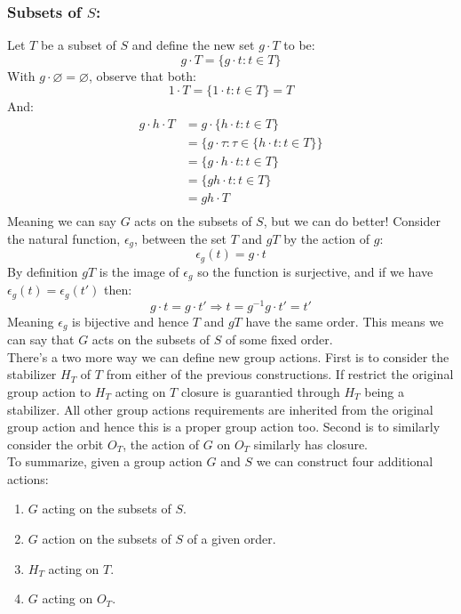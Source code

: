 \subsubsection{Subsets of $S$:}
Let $T$ be a subset of $S$ and define the new set $g\cdot T$ to be:
\[g\cdot T = \{g\cdot t: t\in T\}\]
With $g\cdot\varnothing=\varnothing$, 
observe that both:
\[1\cdot T = \{1\cdot t: t\in T\} = T\]
And:
\[\begin{aligned}
g\cdot h \cdot T &= g\cdot \{h\cdot t:t\in T\}\\
&= \{g\cdot \tau:\tau\in \{h\cdot t:t\in T\}\}\\
&= \{g\cdot h\cdot t:t\in T\}\\
&= \{gh\cdot t:t\in T\}\\
&= gh\cdot T\\
\end{aligned}\]
Meaning we can say $G$ acts on the subsets of $S$,
but we can do better!
Consider the natural function, $\epsilon_g$, between the set $T$ and $gT$ by the action of $g$:
\[\epsilon_g(t) = g\cdot t\]
By definition $gT$ is the image of $\epsilon_g$ so the function is surjective,
and if we have $\epsilon_g(t)=\epsilon_g(t')$ then:
\[g\cdot t = g\cdot t' \Rightarrow t=g^{-1}g\cdot t' = t'\]
Meaning $\epsilon_g$ is bijective and hence $T$ and $gT$ have the same order.
This means we can say that $G$ acts on the subsets of $S$ of some fixed order.
\\

There's a two more way we can define new group actions.
First is to consider the stabilizer $H_T$ of $T$ from either of the previous constructions.
If restrict the original group action to $H_T$ acting on $T$ closure is guarantied through $H_T$ being a stabilizer.
All other group actions requirements are inherited from the original group action and hence this is a proper group action too.
Second is to similarly consider the orbit $O_T$,
the action of $G$ on $O_T$ similarly has closure.
\\

To summarize,
given a group action $G$ and $S$ we can construct four additional actions:
\begin{enumerate}
\item $G$ acting on the subsets of $S$.
\item $G$ action on the subsets of $S$ of a given order.
\item $H_T$ acting on $T$.
\item $G$ acting on $O_T$.
\end{enumerate}


